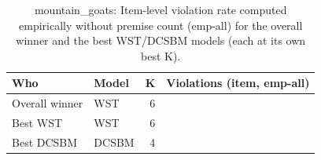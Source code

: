 \begin{table}[!h]
\centering
\caption{mountain_goats: Item-level violation rate computed empirically without premise count (emp-all) for the overall winner and the best WST/DCSBM models (each at its own best K).\\\label{tab:app-mountain_goats-best-item-empall}}
\centering
\begin{tabular}[t]{llrr}
\toprule
Who & Model & K & Violations (item, emp-all)\\
\midrule
Overall winner & WST & 6 & \\
Best WST & WST & 6 & \\
Best DCSBM & DCSBM & 4 & \\
\bottomrule
\end{tabular}
\end{table}
